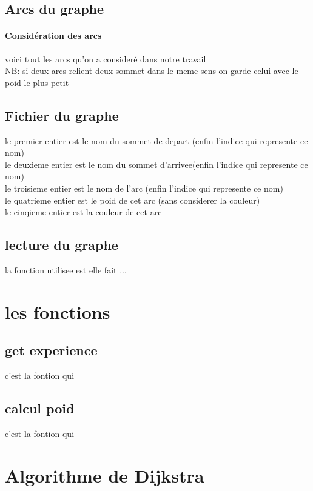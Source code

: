 \documentclass[a4]{article}
\begin{document}
		\subsection{Arcs du graphe}
			\paragraph{Considération des arcs\\}
			voici tout les arcs qu'on a consideré dans notre travail\\
			NB: si deux arcs relient deux sommet dans le meme sens on garde celui avec le poid le plus petit 
			
		\subsection{Fichier du graphe}
			le premier entier est le nom du sommet de depart (enfin l'indice qui represente ce nom)\\
			le deuxieme entier est le nom du sommet d'arrivee(enfin l'indice qui represente ce nom)\\
			le troisieme entier est le nom de l'arc (enfin l'indice qui represente ce nom)\\
			le quatrieme entier est le poid de cet arc (sans considerer la couleur)\\
			le cinqieme entier est la couleur de cet arc\\
			
		\subsection{lecture du graphe}
			la fonction utilisee est elle fait ...
			
	\section{les fonctions}
		\subsection{get experience}
			c'est la fontion qui
			
		\subsection{calcul poid}
			c'est la fontion qui
			
	\section{Algorithme de Dijkstra}
\end{document}
